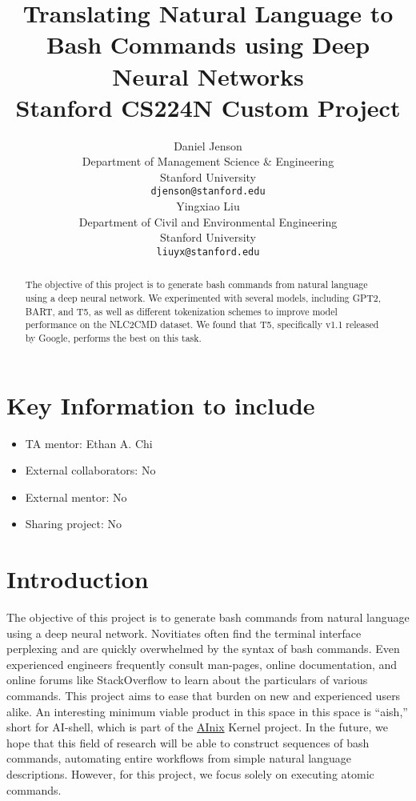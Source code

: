 \documentclass{article}
\title{
  Translating Natural Language to Bash Commands using Deep Neural Networks \\
  \vspace{1em}
  \small{\normalfont Stanford CS224N Custom Project}
}
\author{
 Daniel Jenson \\
  Department of Management Science \& Engineering \\
  Stanford University \\
  \texttt{djenson@stanford.edu} \\
  \And
  Yingxiao Liu \\
  Department of Civil and Environmental Engineering \\
  Stanford University \\
  \texttt{liuyx@stanford.edu} \\
}
\begin{document}
\maketitle

\begin{abstract}
	The objective of this project is to generate bash commands from natural
	language using a deep neural network. We experimented with several models,
	including GPT2, BART, and T5, as well as different tokenization schemes to
	improve model performance on the NLC2CMD dataset. We found that T5,
	specifically v1.1 released by Google, performs the best on this task.
\end{abstract}


\section{Key Information to include}
\begin{itemize}
	\item TA mentor: Ethan A. Chi
	\item External collaborators: No
	\item External mentor: No
	\item Sharing project: No
\end{itemize}


\section{Introduction}
The objective of this project is to generate bash commands from natural
language using a deep neural network. Novitiates often find the terminal
interface perplexing and are quickly overwhelmed by the syntax of bash
commands. Even experienced engineers frequently consult man-pages, online
documentation, and online forums like StackOverflow to learn about the
particulars of various commands. This project aims to ease that burden on new
and experienced users alike. An interesting minimum viable product in this
space in this space is ``aish,'' short for AI-shell, which is part of the
\href{http://anix.org}{AInix} Kernel project. In the future, we hope that this
field of research will be able to construct sequences of bash commands,
automating entire workflows from simple natural language descriptions. However,
for this project, we focus solely on executing atomic commands.
\end{document}
